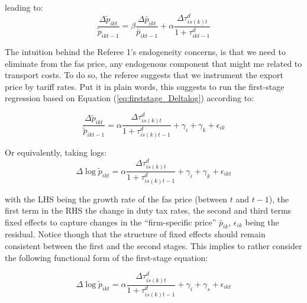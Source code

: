 \documentclass[a4paper,12pt]{article}
\begin{document}
leading to:
\begin{equation}
\frac{\Delta \widetilde{p}_{ikt}}{\widetilde{p}_{ikt-1}} =  \beta \frac{\Delta \bar{p}_{ikt}}{\bar{p}_{ikt-1}} +\alpha\frac{\Delta \tau^d_{is(k)t}}{1+\tau_{ikt-1}^d} \label{eq:firststage_Deltalog}
\end{equation}

The intuition behind the Referee 1's endogeneity concerns, is that we need to eliminate from the fas price, any endogenous component that might me related to transport costs. To do so, the referee suggests that we instrument the export price by tariff rates. Put it in plain words, this suggests to run the first-stage regression based on Equation (\ref{eq:firststage_Deltalog}) according to:

$$\frac{\Delta \widetilde{p}_{ikt}}{\widetilde{p}_{ikt-1}} = \alpha \frac{\Delta \tau^d_{is(k)t}}{1+\tau_{is(k)t-1}^d} + \gamma_{i} +\gamma_{k}+\epsilon_{ik}$$

Or equivalently, taking logs:
$$\Delta \log \widetilde{p}_{ikt}= \alpha\frac{\Delta \tau^d_{is(k)t}}{1+\tau_{is(k)t-1}^d} +\gamma_{i} +\gamma_{k}+\epsilon_{ikt}$$


\noindent with the LHS being the growth rate of the fas price (between $t$ and $t-1$), the first term in the RHS the change in duty tax rates, the second and third terms fixed effects to capture changes in the ``firm-specific price'' $\bar{p}_{ik}$, $\epsilon_{ik}$ being the residual. Notice though that the structure of fixed effects should remain consistent between the first and the second stages. This implies to rather consider the following functional form of the first-stage equation:

\begin{equation}
\Delta \log \widetilde{p}_{ikt} = \alpha\frac{\Delta \tau^d_{is(k)t}}{1+\tau_{is(k)t-1}^d} +\gamma_{i} +\gamma_{s}+\epsilon_{ikt} \label{eq:firststage_Deltalog}
\end{equation}
\end{document}
